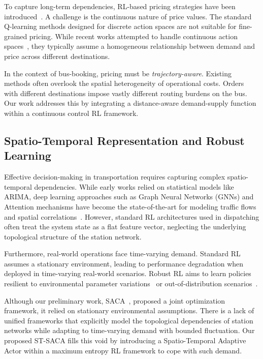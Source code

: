 \documentclass[lettersize,journal]{IEEEtran}
\begin{document}
To capture long-term dependencies, RL-based pricing strategies have been introduced~\cite{ref:Lei2023, ref:Ge2025}. A challenge is the continuous nature of price values. The standard Q-learning methods designed for discrete action spaces are not suitable for fine-grained pricing. While recent works attempted to handle continuous action spaces~\cite{ref:ROSDR}, they typically assume a homogeneous relationship between demand and price across different destinations.

In the context of bus-booking, pricing must be \textit{trajectory-aware}. Existing methods often overlook the spatial heterogeneity of operational costs. Orders with different destinations impose vastly different routing burdens on the bus. Our work addresses this by integrating a distance-aware demand-supply function within a continuous control RL framework.

\subsection{Spatio-Temporal Representation and Robust Learning} Effective decision-making in transportation requires capturing complex spatio-temporal dependencies. While early works relied on statistical models like ARIMA, deep learning approaches such as Graph Neural Networks (GNNs) and Attention mechanisms have become the state-of-the-art for modeling traffic flows~\cite{ref:STPivotal} and spatial correlations~\cite{ijcai/YuYZ18}. However, standard RL architectures used in dispatching often treat the system state as a flat feature vector, neglecting the underlying topological structure of the station network.

Furthermore, real-world operations face time-varying demand. Standard RL assumes a stationary environment, leading to performance degradation when deployed in time-varying real-world scenarios. Robust RL aims to learn policies resilient to environmental parameter variations~\cite{ref:RobustRoute, ref:RobustMARL} or out-of-distribution scenarios~\cite{ref:Yoon2024IJCAI}.

Although our preliminary work, SACA~\cite{ref:saca}, proposed a joint optimization framework, it relied on stationary environmental assumptions. There is a lack of unified frameworks that explicitly model the topological dependencies of station networks while adapting to time-varying demand with bounded fluctuation. Our proposed ST-SACA fills this void by introducing a Spatio-Temporal Adaptive Actor within a maximum entropy RL framework to cope with such demand.
\end{document}
